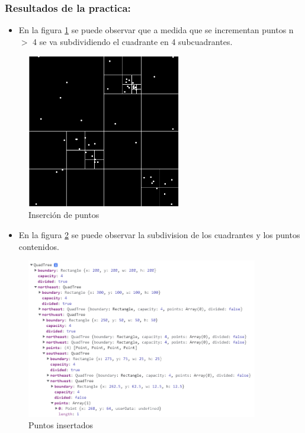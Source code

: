 \documentclass{article}
\begin{document}
\subsubsection{Resultados de la practica: }

\begin{itemize}
\item En la figura \ref{fig:quadtree_insert} se puede observar que a medida que se incrementan puntos n $>$ 4 se va subdividiendo el cuadrante en 4 subcuadrantes.
\end{itemize}

\begin{figure}[h!]
\centering
\includegraphics[width=0.6\textwidth]{img/quadtree_insert.png}
\caption{Inserción de puntos}
\label{fig:quadtree_insert}
\end{figure}

\begin{itemize}
\item En la figura \ref{fig:quadtree_insert_data} se puede observar la subdivision de los cuadrantes y los puntos contenidos.
\end{itemize}

\begin{figure}[h!]
\centering
\includegraphics[width=0.9\textwidth]{img/quadtree_insert_data.png}
\caption{Puntos insertados}
\label{fig:quadtree_insert_data}
\end{figure}
\end{document}
